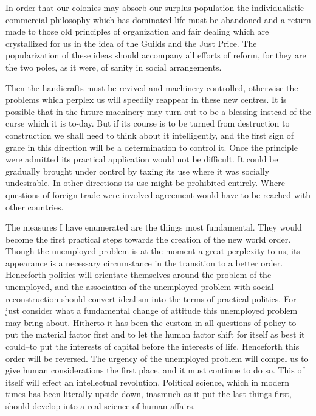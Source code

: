 \documentclass{book}
\begin{document}
In order that our colonies may absorb our surplus population the individualistic commercial philosophy which has dominated life must be abandoned and a return made to those old principles of organization and fair dealing which are crystallized for us in the idea of the Guilds and the Just Price. The popularization of these ideas should accompany all efforts of reform, for they are the two poles, as it were, of sanity in social arrangements.

Then the handicrafts must be revived and machinery controlled, otherwise the problems which perplex us will speedily reappear in these new centres. It is possible that in the future machinery may turn out to be a blessing instead of the curse which it is to-day. But if its course is to be turned from destruction to construction we shall need to think about it intelligently, and the first sign of grace in this direction will be a determination to control it. Once the principle were admitted its practical application would not be difficult. It could be gradually brought under control by taxing its use where it was socially undesirable. In other directions its use might be prohibited entirely. Where questions of foreign trade were involved agreement would have to be reached with other countries.

The measures I have enumerated are the things most fundamental. They would become the first practical steps towards the creation of the new world order. Though the unemployed problem is at the moment a great perplexity to us, its appearance is a necessary circumstance in the transition to a better order. Henceforth politics will orientate themselves around the problem of the unemployed, and the association of the unemployed problem with social reconstruction should convert idealism into the terms of practical politics. For just consider what a fundamental change of attitude this unemployed problem may bring about. Hitherto it has been the custom in all questions of policy to put the material factor first and to let the human factor shift for itself as best it could–to put the interests of capital before the interests of life. Henceforth this order will be reversed. The urgency of the unemployed problem will compel us to give human considerations the first place, and it must continue to do so. This of itself will effect an intellectual revolution. Political science, which in modern times has been literally upside down, inasmuch as it put the last things first, should develop into a real science of human affairs.
\end{document}

